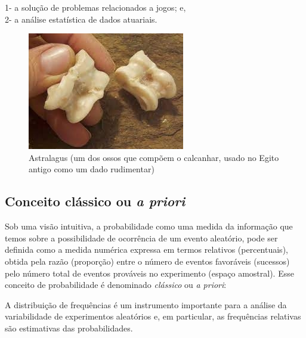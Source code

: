 \documentclass[
]{book}
\begin{document}
\hfill\break

1- a solução de problemas relacionados a jogos; e,\\
2- a análise estatística de dados atuariais.

\hfill\break

\begin{figure}

{\centering \includegraphics[width=0.8\linewidth]{images4/astralagus} 

}

\caption{Astralagus (um dos ossos que compõem o calcanhar, usado no Egito antigo como um dado rudimentar)}\label{fig:unnamed-chunk-60}
\end{figure}

\hypertarget{conceito-cluxe1ssico-ou-a-priori}{%
\subsection{\texorpdfstring{Conceito clássico ou \emph{a priori}}{Conceito clássico ou a priori}}\label{conceito-cluxe1ssico-ou-a-priori}}

Sob uma visão intuitiva, a probabilidade como uma medida da informação que temos sobre a possibilidade de ocorrência de um evento aleatório, pode ser definida como a medida numérica expressa em termos relativos (percentuais), obtida pela razão (proporção) entre o número de eventos favoráveis (sucessos) pelo número total de eventos prováveis no experimento (espaço amostral). Esse conceito de probabilidade é denominado \emph{clássico} ou \emph{a priori}:

\hfill\break

A distribuição de frequências é um instrumento importante para a análise da variabilidade de experimentos aleatórios e, em particular, as frequências relativas são estimativas das probabilidades.
\end{document}
